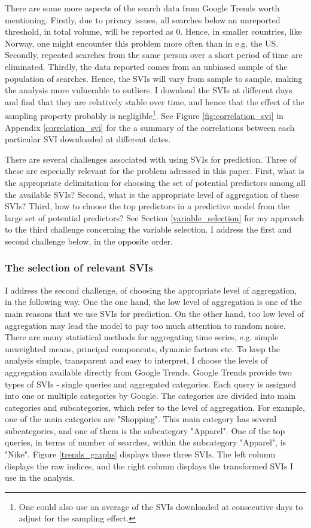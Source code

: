 There are some more aspects of the search data from Google Trends worth mentioning. Firstly, due to privacy issues, all searches below an unreported threshold, in total volume, will be reported as 0. Hence, in smaller countries, like Norway, one might encounter this problem more often than in e.g. the US. Secondly, repeated searches from the same person over a short period of time are eliminated. Thirdly, the data reported comes from an unbiased sample of the population of searches. Hence, the SVIs will vary from sample to sample, making the analysis more vulnerable to outliers. I download the SVIs at different days and find that they are relatively stable over time, and hence that the effect of the sampling property probably is negligible\footnote{One could also use an average of the SVIs downloaded at consecutive days to adjust for the sampling effect.}. See Figure \ref{fig:correlation_svi} in Appendix \ref{correlation_svi} for the a summary of the correlations between each particular SVI downloaded at different dates.

There are several challenges associated with using SVIs for prediction. Three of these are especially relevant for the problem adressed in this paper. First, what is the appropriate delimitation for choosing the set of potential predictors among all the available SVIs? Second, what is the appropriate level of aggregation of these SVIs? Third, how to choose the top predictors in a predictive model from the large set of potential predictors? See Section \ref{variable_selection} for my approach to the third challenge concerning the variable selection. I address the first and second challenge below, in the opposite order.


\subsubsection{The selection of relevant SVIs}\label{svi_selection}

I address the second challenge, of choosing the appropriate level of aggregation, in the following way. One the one hand, the low level of aggregation is one of the main reasons that we use SVIs for prediction. On the other hand, too low level of aggregation may lead the model to pay too much attention to random noise. There are many statistical methods for aggregating time series, e.g. simple unweighted means, principal components, dynamic factors etc. To keep the analysis simple, transparent and easy to interpret, I choose the levels of aggregation available directly from Google Trends. Google Trends provide two types of SVIs - single queries and aggregated categories. Each query is assigned into one or multiple categories by Google. The categories are divided into main categories and subcategories, which refer to the level of aggregation. For example, one of the main categories are "Shopping". This main category has several subcategories, and one of them is the subcategory "Apparel". One of the top queries, in terms of number of searches, within the subcategory "Apparel", is "Nike". Figure \ref{trends_graphs} displays these three SVIs. The left column displays the raw indices, and the right column displays the transformed SVIs I use in the analysis.

